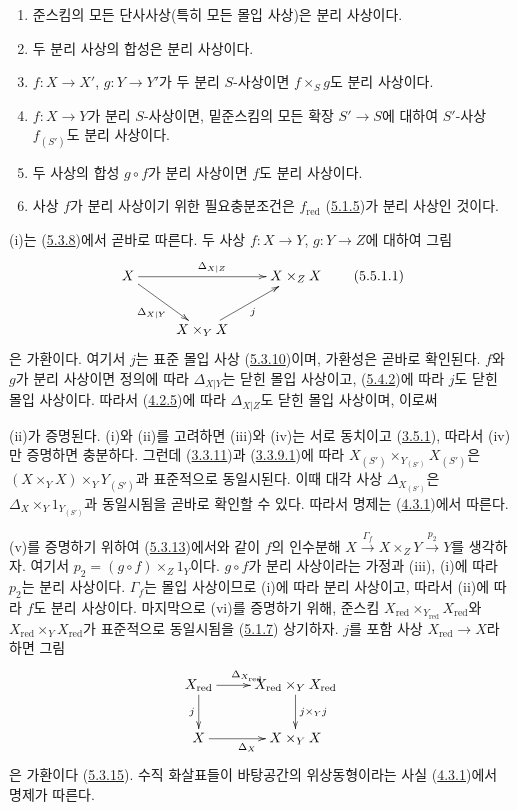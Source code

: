 \begin{proposition}[5.5.1]
\label{I.5.5.1-ko}
\begin{enumerate}
  \item[\rm(i)] 준스킴의 모든 단사사상(특히 모든 몰입 사상)은 분리
    사상이다.
  \item[\rm(ii)] 두 분리 사상의 합성은 분리 사상이다.
  \item[\rm(iii)] $f:X\to X'$, $g:Y\to Y'$가 두 분리 $S$-사상이면
    $f\times_S g$도 분리 사상이다.
  \item[\rm(iv)] $f:X\to Y$가 분리 $S$-사상이면, 밑준스킴의 모든 확장
    $S'\to S$에 대하여 $S'$-사상 $f_{(S')}$도 분리 사상이다.
  \item[\rm(v)] 두 사상의 합성 $g\circ f$가 분리 사상이면 $f$도 분리
    사상이다.
  \item[\rm(vi)] 사상 $f$가 분리 사상이기 위한 필요충분조건은
    $f_{\mathrm{red}}$ (\hyperref[I.5.1.5-ko]{5.1.5})가 분리 사상인
    것이다.
\end{enumerate}
\end{proposition}

(i)는 (\hyperref[I.5.3.8-ko]{5.3.8})에서 곧바로 따른다. 두 사상
$f:X\to Y$, $g:Y\to Z$에 대하여 그림
\[
  \xymatrix{
    X\ar[rr]^{\Delta_{X|Z}}\ar[dr]_{\Delta_{X|Y}} & &
    X\times_Z X\\
    & X\times_Y X\ar[ur]_j
  }
  \tag{5.5.1.1}\label{I.5.5.1.1-ko}
\]
은 가환이다. 여기서 $j$는 표준 몰입 사상
(\hyperref[I.5.3.10-ko]{5.3.10})이며, 가환성은 곧바로 확인된다.
$f$와 $g$가 분리 사상이면 정의에 따라 $\Delta_{X|Y}$는 닫힌 몰입
사상이고, (\hyperref[I.5.4.2-ko]{5.4.2})에 따라 $j$도 닫힌 몰입
사상이다. 따라서 (\hyperref[I.4.2.5-ko]{4.2.5})에 따라
$\Delta_{X|Z}$도 닫힌 몰입 사상이며, 이로써

(ii)가 증명된다. (i)와 (ii)를 고려하면 (iii)와 (iv)는 서로
동치이고 (\hyperref[I.3.5.1-ko]{3.5.1}), 따라서 (iv)만 증명하면
충분하다. 그런데 (\hyperref[I.3.3.11-ko]{3.3.11})과
(\hyperref[I.3.3.9.1-ko]{3.3.9.1})에 따라
$X_{(S')}\times_{Y_{(S')}}X_{(S')}$은
$(X\times_Y X)\times_Y Y_{(S')}$과 표준적으로 동일시된다. 이때 대각
사상 $\Delta_{X_{(S')}}$은
$\Delta_X\times_Y 1_{Y_{(S')}}$과 동일시됨을 곧바로 확인할 수 있다.
따라서 명제는 (\hyperref[I.4.3.1-ko]{4.3.1})에서 따른다.

(v)를 증명하기 위하여 (\hyperref[I.5.3.13-ko]{5.3.13})에서와 같이
$f$의 인수분해
$X\xrightarrow{\Gamma_f}X\times_Z Y\xrightarrow{p_2}Y$를 생각하자.
여기서 $p_2=(g\circ f)\times_Z 1_Y$이다. $g\circ f$가 분리
사상이라는 가정과 (iii), (i)에 따라 $p_2$는 분리 사상이다.
$\Gamma_f$는 몰입 사상이므로 (i)에 따라 분리 사상이고, 따라서
(ii)에 따라 $f$도 분리 사상이다. 마지막으로 (vi)를 증명하기 위해,
준스킴 $X_{\mathrm{red}}\times_{Y_{\mathrm{red}}}X_{\mathrm{red}}$와
$X_{\mathrm{red}}\times_Y X_{\mathrm{red}}$가 표준적으로 동일시됨을
(\hyperref[I.5.1.7-ko]{5.1.7}) 상기하자. $j$를 포함 사상
$X_{\mathrm{red}}\to X$라 하면 그림
\[
  \xymatrix{
    X_{\mathrm{red}}\ar[r]^{\Delta_{X_{\mathrm{red}}}}\ar[d]_j &
    X_{\mathrm{red}}\times_Y X_{\mathrm{red}}\ar[d]^{j\times_Y j}\\
    X\ar[r]_{\Delta_X} & X\times_Y X
  }
\]
은 가환이다 (\hyperref[I.5.3.15-ko]{5.3.15}). 수직 화살표들이
바탕공간의 위상동형이라는 사실
(\hyperref[I.4.3.1-ko]{4.3.1})에서 명제가 따른다.

